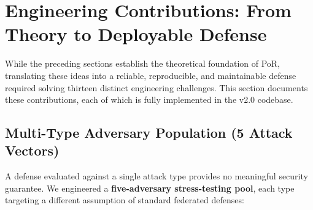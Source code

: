 \documentclass[journal]{IEEEtran}
\begin{document}
\newpage
\section{Engineering Contributions: From Theory to Deployable Defense}\label{sec:engineering}

While the preceding sections establish the theoretical foundation of PoR, translating these ideas into a reliable, reproducible, and maintainable defense required solving thirteen distinct engineering challenges. This section documents these contributions, each of which is fully implemented in the v2.0 codebase.

\subsection{Multi-Type Adversary Population (5 Attack Vectors)}

A defense evaluated against a single attack type provides no meaningful security guarantee. We engineered a \textbf{five-adversary stress-testing pool}, each type targeting a different assumption of standard federated defenses:
\end{document}
